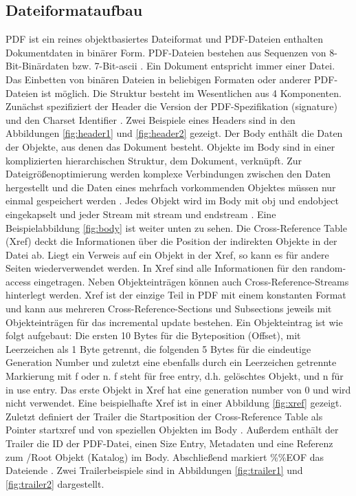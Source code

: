 \subsection{Dateiformataufbau}
PDF ist ein reines objektbasiertes Dateiformat und PDF-Dateien enthalten Dokumentdaten in binärer Form. PDF-Dateien bestehen aus Sequenzen von 8-Bit-Binärdaten bzw. 7-Bit-\gls{ascii} \cite{schneeberger}. Ein Dokument entspricht immer einer Datei. Das Einbetten von binären Dateien in beliebigen Formaten oder anderer PDF-Dateien ist möglich. Die Struktur besteht im Wesentlichen aus 4 Komponenten. Zunächst spezifiziert der Header die Version der PDF-Spezifikation (signature) und den Charset Identifier \cite{ccc-pdf-secrets}. Zwei Beispiele eines Headers sind in den Abbildungen \ref{fig:header1} und \ref{fig:header2} gezeigt. Der Body enthält die Daten der Objekte, aus denen das Dokument besteht. Objekte im Body sind in einer komplizierten hierarchischen Struktur, dem Dokument, verknüpft. Zur Dateigrößenoptimierung werden komplexe Verbindungen zwischen den Daten hergestellt und die Daten eines mehrfach vorkommenden Objektes müssen nur einmal gespeichert werden \cite{softx}. Jedes Objekt wird im Body mit obj und endobject eingekapselt und jeder Stream mit stream und endstream \cite{schneeberger}. Eine Beispielabbildung \ref{fig:body} ist weiter unten zu sehen. Die Cross-Reference Table (Xref) deckt die Informationen über die Position der indirekten Objekte in der Datei ab. Liegt ein Verweis auf ein Objekt in der Xref, so kann es für andere Seiten wiederverwendet werden. In Xref sind alle Informationen für den random-access eingetragen. Neben Objekteinträgen können auch Cross-Reference-Streams hinterlegt werden. Xref ist der einzige Teil in PDF mit einem konstanten Format und kann aus mehreren Cross-Reference-Sections und Subsections jeweils mit Objekteinträgen für das incremental update bestehen. Ein Objekteintrag ist wie folgt aufgebaut: Die ersten 10 Bytes für die Byteposition (Offset), mit Leerzeichen als 1 Byte getrennt, die folgenden 5 Bytes für die eindeutige Generation Number und zuletzt eine ebenfalls durch ein Leerzeichen getrennte Markierung mit f oder n. f steht für free entry, d.h. gelöschtes Objekt, und n für in use entry. Das erste Objekt in Xref hat eine generation number von 0 und wird nicht verwendet. Eine beispielhafte Xref ist in einer Abbildung \ref{fig:xref} gezeigt. Zuletzt definiert der Trailer die Startposition der Cross-Reference Table als Pointer startxref und von speziellen Objekten im Body \cite{ccc-break-pdf}.  Außerdem enthält der Trailer die ID der PDF-Datei, einen Size Entry, Metadaten und eine Referenz zum /Root Objekt (Katalog) im Body. Abschließend markiert \%\%EOF das Dateiende \cite{ccc-break-pdf, ccc-pdf-secrets}. Zwei Trailerbeispiele sind in Abbildungen \ref{fig:trailer1} und \ref{fig:trailer2} dargestellt.


